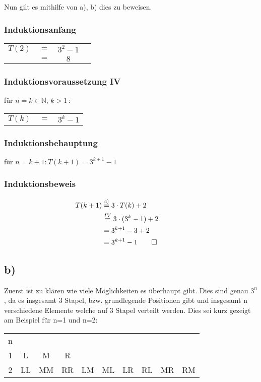 \documentclass[titlepage]{article}
\begin{document}
		\noindent
		Nun gilt es mithilfe von a), b) dies zu beweisen.
		
		\subsubsection*{Induktionsanfang}
		\begin{tabular}{lccl}
			$T(2)$ & $=$ & $3^2-1$ & \\
			& $=$ & $8$ &
		\end{tabular}
		
		\subsubsection*{Induktionsvoraussetzung IV}
		für $n=k \in \mathbb{N},\,k > 1 \, :$
		\begin{tabular}{lcc}
			$T(k)$ & $=$ & $3^k-1$ \\
		\end{tabular}
	
		\subsubsection*{Induktionsbehauptung}
		für $n=k+1 : T(k+1)=3^{k+1}-1$
		
		\subsubsection*{Induktionsbeweis}
		\begin{align*}
			T(k+1) &\overset{c)}{=}3\cdot T(k)+2&&&&&&&&\\
			&\overset{IV}{=}3\cdot(3^k-1)+2\\	
			&=3^{k+1}-3+2\\
			&=3^{k+1}-1\qed				
		\end{align*}
	
		\subsection*{b)}
		Zuerst ist zu klären wie viele Möglichkeiten es überhaupt gibt. Dies sind genau $3^n$, da es insgesamt 3 Stapel, bzw. grundlegende Positionen gibt und insgesamt n verschiedene Elemente welche auf 3 Stapel verteilt werden. Dies sei kurz gezeigt am Beispiel für n=1 und n=2:
		\begin{table}[h]
			\begin{tabular}{c|ccccccccc}
				n&&&&&&&&&\\
				1&L&M&R&&&&&&\\
				2&LL&MM&RR&LM&ML&LR&RL&MR&RM
			\end{tabular}
		\end{table}
	
\end{document}
